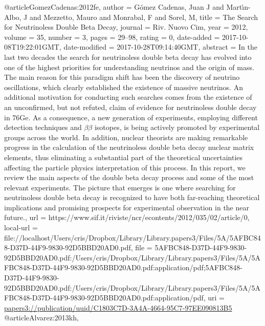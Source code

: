 {{{{{{{{{{{@article{GomezCadenas:2012fe,
author = {G{\'o}mez Cadenas, Juan J and Mart{\'\i}n-Albo, J and Mezzetto, Mauro and Monrabal, F and Sorel, M},
title = {{The Search for Neutrinoless Double Beta Decay}},
journal = {Riv. Nuovo Cim},
year = {2012},
volume = {35},
number = {3},
pages = {29--98},
rating = {0},
date-added = {2017-10-08T19:22:01GMT},
date-modified = {2017-10-28T09:14:40GMT},
abstract = {In the last two decades the search for neutrinoless double beta decay has evolved into one of the highest priorities for understanding neutrinos and the origin of mass.  The main reason for this paradigm shift has been the discovery of neutrino oscillations, which clearly established the existence of massive neutrinos.  An additional motivation for conducting such searches comes from the existence of an unconfirmed, but not refuted, claim of evidence for neutrinoless double decay in 76Ge.  As a consequence, a new generation of experiments, employing different detection techniques and $\beta$$\beta$ isotopes, is being actively promoted by experimental groups across the world.  In addition, nuclear theorists are making remarkable progress in the calculation of the neutrinoless double beta decay nuclear matrix elements, thus eliminating a substantial part of the theoretical uncertainties affecting the particle physics interpretation of this process.  In this report, we review the main aspects of the double beta decay process and some of the most relevant experiments.  The picture that emerges is one where searching for neutrinoless double beta decay is recognized to have both far-reaching theoretical implications and promising prospects for experimental observation in the near future.},
url = {https://www.sif.it/riviste/ncr/econtents/2012/035/02/article/0},
local-url = {file://localhost/Users/cris/Dropbox/Library/Library.papers3/Files/5A/5AFBC848-D37D-44F9-9830-92D5BBD20AD0.pdf},
file = {{5AFBC848-D37D-44F9-9830-92D5BBD20AD0.pdf:/Users/cris/Dropbox/Library/Library.papers3/Files/5A/5AFBC848-D37D-44F9-9830-92D5BBD20AD0.pdf:application/pdf;5AFBC848-D37D-44F9-9830-92D5BBD20AD0.pdf:/Users/cris/Dropbox/Library/Library.papers3/Files/5A/5AFBC848-D37D-44F9-9830-92D5BBD20AD0.pdf:application/pdf}},
uri = {\url{papers3://publication/uuid/C1803C7D-3A4A-4664-95C7-97EE090813B5}}
}
@article{Alvarez:2013kh,
}}}}}}}}}}}}
